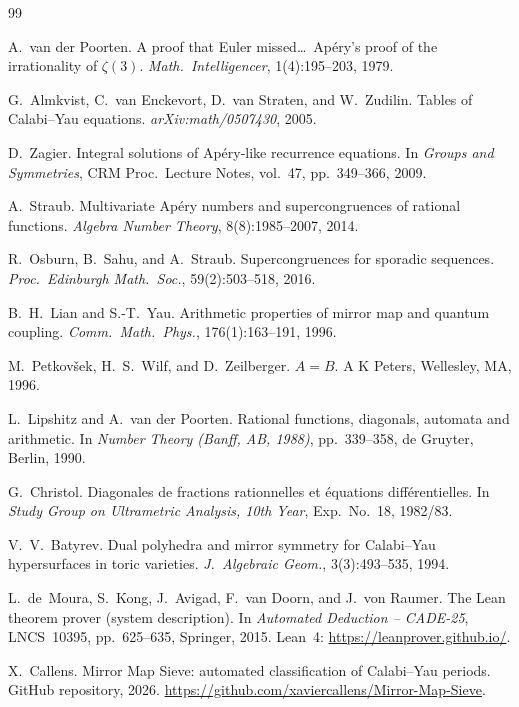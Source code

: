 \documentclass[11pt, a4paper]{article}
\begin{document}
\begin{thebibliography}{99}

A.~van der Poorten.
\newblock A proof that Euler missed\ldots\ Ap\'ery's proof of the
irrationality of $\zeta(3)$.
\newblock \textit{Math.\ Intelligencer}, 1(4):195--203, 1979.

G.~Almkvist, C.~van Enckevort, D.~van Straten, and W.~Zudilin.
\newblock Tables of Calabi--Yau equations.
\newblock \textit{arXiv:math/0507430}, 2005.

D.~Zagier.
\newblock Integral solutions of {Ap\'ery}-like recurrence equations.
\newblock In \textit{Groups and Symmetries}, CRM Proc.\ Lecture Notes,
vol.~47, pp.~349--366, 2009.

A.~Straub.
\newblock Multivariate {Ap\'ery} numbers and supercongruences of rational
functions.
\newblock \textit{Algebra Number Theory}, 8(8):1985--2007, 2014.

R.~Osburn, B.~Sahu, and A.~Straub.
\newblock Supercongruences for sporadic sequences.
\newblock \textit{Proc.\ Edinburgh Math.\ Soc.}, 59(2):503--518, 2016.

B.~H.~Lian and S.-T.~Yau.
\newblock Arithmetic properties of mirror map and quantum coupling.
\newblock \textit{Comm.\ Math.\ Phys.}, 176(1):163--191, 1996.

M.~Petkov\v{s}ek, H.~S.~Wilf, and D.~Zeilberger.
\newblock \textit{$A=B$}.
\newblock A K Peters, Wellesley, MA, 1996.

L.~Lipshitz and A.~van der Poorten.
\newblock Rational functions, diagonals, automata and arithmetic.
\newblock In \textit{Number Theory (Banff, AB, 1988)},
pp.~339--358, de Gruyter, Berlin, 1990.

G.~Christol.
\newblock Diagonales de fractions rationnelles et \'equations diff\'erentielles.
\newblock In \textit{Study Group on Ultrametric Analysis, 10th Year},
Exp.\ No.~18, 1982/83.

V.~V.~Batyrev.
\newblock Dual polyhedra and mirror symmetry for Calabi--Yau hypersurfaces
in toric varieties.
\newblock \textit{J.\ Algebraic Geom.}, 3(3):493--535, 1994.

L.~de~Moura, S.~Kong, J.~Avigad, F.~van Doorn, and J.~von Raumer.
\newblock The {Lean} theorem prover (system description).
\newblock In \textit{Automated Deduction -- CADE-25}, LNCS~10395,
pp.~625--635, Springer, 2015.
\newblock Lean~4: \url{https://leanprover.github.io/}.

X.~Callens.
\newblock Mirror Map Sieve: automated classification of Calabi--Yau periods.
\newblock GitHub repository, 2026.
\newblock \url{https://github.com/xaviercallens/Mirror-Map-Sieve}.

\end{thebibliography}
\end{document}
